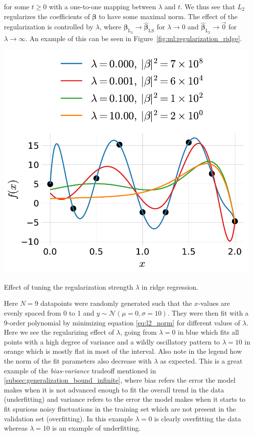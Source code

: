 for some $t \geq 0$ with a one-to-one mapping between $\lambda$ and $t$. We thus see that $L_2$ regularizes the coefficients of $\bm{\beta}$ to have some maximal norm. The effect of the regularization is controlled by $\lambda$, where $\hat{\bm{\beta}}_{\mathrm{L_2}} \rightarrow \hat{\bm{\beta}}_{\mathrm{LS}}$ for $\lambda \rightarrow 0$ and $\hat{\bm{\beta}}_{\mathrm{L_2}} \rightarrow \vec{0}$ for $\lambda \rightarrow \infty$. An example of this can be seen in Figure~\ref{fig:ml:regularization_ridge}. 
\begin{marginfigure}
  \includegraphics[width=0.99\textwidth, trim=5 5 5 5, clip]{figures/ridge_regression/ridge.pdf}
  \caption[Regularization Effect]
    {Effect of tuning the regularization strength $\lambda$ in ridge regression.
    }
  \label{fig:ml:regularization_ridge}
\end{marginfigure}
Here $N=9$ datapoints were randomly generated such that the $x$-values are evenly spaced from \num{0} to \num{1} and $y \sim \mathcal{N}(\mu=0, \sigma=10)$. They were then fit with a \num{9}-order polynomial by minimizing equation \eqref{eq:l2_norm} for different values of $\lambda$. Here we see the regularizing effect of $\lambda$, going from $\lambda=0$ in blue which fits all points with a high degree of variance and a wildly oscillatory pattern to $\lambda=10$ in orange which is mostly flat in most of the interval. Also note in the legend how the norm of the fit parameters also decrease with $\lambda$ as expected. This is a great example of the \emph{bias-variance} tradeoff mentioned in \autoref{subsec:generalization_bound_infinite}, where bias refers the error the model makes when it is not advanced enough to fit the overall trend in the data (underfitting) and variance refers to the error the model makes when it starts to fit spurious noisy fluctuations in the training set which are not present in the validation set (overfitting). In this example $\lambda=0$ is clearly overfitting the data whereas $\lambda=10$ is an example of underfitting. 

